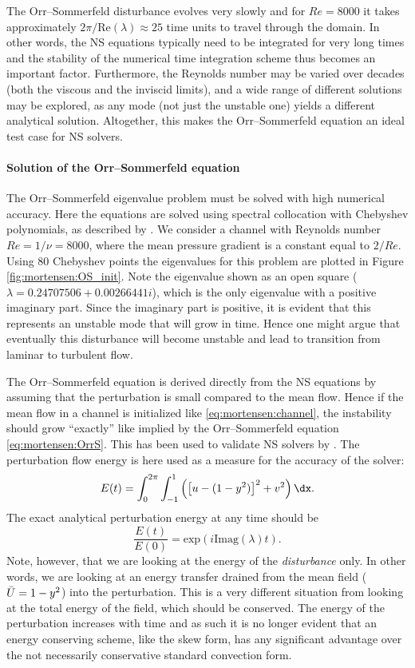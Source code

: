The Orr--Sommerfeld disturbance evolves very slowly and for $Re=8000$ it
takes approximately $2 \pi/\text{Re}(\lambda)\approx 25$ time units to
travel through the domain. In other words, the NS equations typically need
to be integrated for very long times and the stability of the numerical
time integration scheme thus becomes an important factor. Furthermore,
the Reynolds number may be varied over decades (both the viscous and the
inviscid limits), and a wide range of different solutions may be explored,
as any mode (not just the unstable one) yields a different analytical
solution. Altogether, this makes the Orr--Sommerfeld equation an ideal
test case for NS solvers.

\paragraph{Solution of the Orr--Sommerfeld equation}

The Orr--Sommerfeld eigenvalue problem must be solved with high numerical
accuracy. Here the equations are solved using spectral collocation
with Chebyshev polynomials, as described by \citet{Trefethen2006}. We
consider a channel with Reynolds number $Re=1/\nu=8000$, where
the mean pressure gradient is a constant equal to $2/Re$. Using 80
Chebyshev points the eigenvalues for this problem are plotted in Figure
\ref{fig:mortensen:OS_init}. Note the eigenvalue shown as an open
square ($\lambda =
0.24707506 + 0.00266441 i$), which is the only eigenvalue with a positive
imaginary part. Since the imaginary part is positive, it is evident that
this represents an unstable mode that will grow in time.
Hence one might argue that eventually this disturbance will become
unstable and lead to transition from laminar to turbulent flow.

The Orr--Sommerfeld equation is derived directly from the NS equations
by assuming that the perturbation is small compared to the mean
flow. Hence if the mean flow in a channel is initialized like
\eqref{eq:mortensen:channel}, the instability should grow ``exactly''
like implied by the Orr--Sommerfeld equation
\eqref{eq:mortensen:OrrS}. This has been used to validate NS solvers
by \citet{MalikZangHussaini1984}. The perturbation flow energy is here
used as a measure for the accuracy of the solver:
\begin{equation}
  E(t)= \int_0^{2\pi}\int_{-1}^{1} \left( \left[u-(1-y^2)\right]^2
    + v^2 \right) \dx.
\end{equation}
The exact analytical perturbation energy at any time should be
\begin{equation}
 \frac{E(t)}{E(0)}=\mathrm{exp}(i \mathrm{Imag}(\lambda) t).
\end{equation}
Note, however, that we are looking at the energy of the
\textit{disturbance} only. In other words, we are looking at an
energy transfer drained from the mean field ($\Bar{U}=1-y^2$) into
the perturbation. This is a very different situation from looking at
the total energy of the field, which should be conserved. The energy of
the perturbation increases with time and as such it is no longer evident
that an energy conserving scheme, like the skew form, has any significant
advantage over the not necessarily conservative standard convection form.

